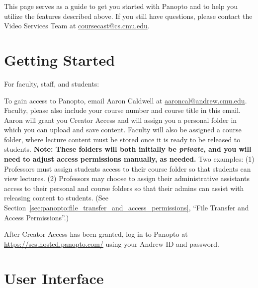 	\begin{note}
		This page serves as a guide to get you started with Panopto and to help you utilize the features described above. If you still have questions, please contact the Video Services Team at \href{mailto:coursecast@cs.cmu.edu}{coursecast@cs.cmu.edu}.
	\end{note}


\section{Getting Started}
\label{sec:panopto:getting_started}


\begin{gram}
For faculty, staff, and students:

To gain access to Panopto, email Aaron Caldwell at \href{mailto:aaroncal@andrew.cmu.edu?subject=Creator Access}{aaroncal@andrew.cmu.edu}. Faculty, please also include your course number and course title in this email. Aaron will grant you Creator Access and will assign you a personal folder in which you can upload and save content. Faculty will also be assigned a course folder, where lecture content must be stored once it is ready to be released to students. \textbf{Note: These folders will both initially be \emph{private}, and you will need to adjust access permissions manually, as needed.} Two examples: (1) Professors must assign students access to their course folder so that students can view lectures. (2) Professors may choose to assign their administrative assistants access to their personal and course folders so that their admins can assist with releasing content to students. (See Section~\ref{sec:panopto:file_transfer_and_access_permissions}, ``File Transfer and Access Permissions''.)

After Creator Access has been granted, log in to Panopto at \href{https://scs.hosted.panopto.com/}{https://scs.hosted.panopto.com/} using your Andrew ID and password.
\end{gram}

\section{User Interface}
\label{sec:panopto:user_interface}

